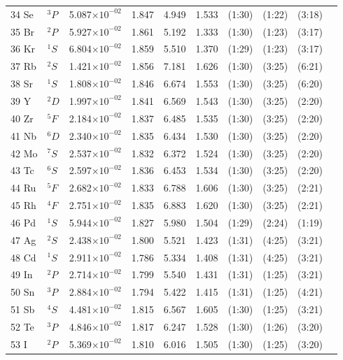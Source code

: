 \documentclass[12pt]{report}
\begin{document}
\begin{longtable}{l l r r r r r r r r}
34 Se & $^{3}P$ & 5.087$\times10^{-02}$ & 1.847 & 4.949 & 1.533 & (1:30) & (1:22) & (3:18)   \\
35 Br & $^{2}P$ & 5.927$\times10^{-02}$ & 1.861 & 5.192 & 1.333 & (1:30) & (1:23) & (3:17)   \\
36 Kr & $^{1}S$ & 6.804$\times10^{-02}$ & 1.859 & 5.510 & 1.370 & (1:29) & (1:23) & (3:17)   \\
37 Rb & $^{2}S$ & 1.421$\times10^{-02}$ & 1.856 & 7.181 & 1.626 & (1:30) & (3:25) & (6:21)   \\
38 Sr & $^{1}S$ & 1.808$\times10^{-02}$ & 1.846 & 6.674 & 1.553 & (1:30) & (3:25) & (6:20)   \\
39 Y & $^{2}D$ & 1.997$\times10^{-02}$ & 1.841 & 6.569 & 1.543 & (1:30) & (3:25) & (2:20)   \\
40 Zr & $^{5}F$ & 2.184$\times10^{-02}$ & 1.837 & 6.485 & 1.535 & (1:30) & (3:25) & (2:20)   \\
41 Nb & $^{6}D$ & 2.340$\times10^{-02}$ & 1.835 & 6.434 & 1.530 & (1:30) & (3:25) & (2:20)   \\
42 Mo & $^{7}S$ & 2.537$\times10^{-02}$ & 1.832 & 6.372 & 1.524 & (1:30) & (3:25) & (2:20)   \\
43 Tc & $^{6}S$ & 2.597$\times10^{-02}$ & 1.836 & 6.453 & 1.534 & (1:30) & (3:25) & (2:20)   \\
44 Ru & $^{5}F$ & 2.682$\times10^{-02}$ & 1.833 & 6.788 & 1.606 & (1:30) & (3:25) & (2:21)   \\
45 Rh & $^{4}F$ & 2.751$\times10^{-02}$ & 1.835 & 6.883 & 1.620 & (1:30) & (3:25) & (2:21)   \\
46 Pd & $^{1}S$ & 5.944$\times10^{-02}$ & 1.827 & 5.980 & 1.504 & (1:29) & (2:24) & (1:19)   \\
47 Ag & $^{2}S$ & 2.438$\times10^{-02}$ & 1.800 & 5.521 & 1.423 & (1:31) & (4:25) & (3:21)   \\
48 Cd & $^{1}S$ & 2.911$\times10^{-02}$ & 1.786 & 5.334 & 1.408 & (1:31) & (4:25) & (3:21)   \\
49 In & $^{2}P$ & 2.714$\times10^{-02}$ & 1.799 & 5.540 & 1.431 & (1:31) & (1:25) & (3:21)   \\
50 Sn & $^{3}P$ & 2.884$\times10^{-02}$ & 1.794 & 5.422 & 1.415 & (1:31) & (1:25) & (4:21)   \\
51 Sb & $^{4}S$ & 4.481$\times10^{-02}$ & 1.815 & 6.567 & 1.605 & (1:30) & (1:25) & (3:21)   \\
52 Te & $^{3}P$ & 4.846$\times10^{-02}$ & 1.817 & 6.247 & 1.528 & (1:30) & (1:26) & (3:20)   \\
53 I & $^{2}P$ & 5.369$\times10^{-02}$ & 1.810 & 6.016 & 1.505 & (1:30) & (1:25) & (3:20)   \\

\end{longtable}
\end{document}
